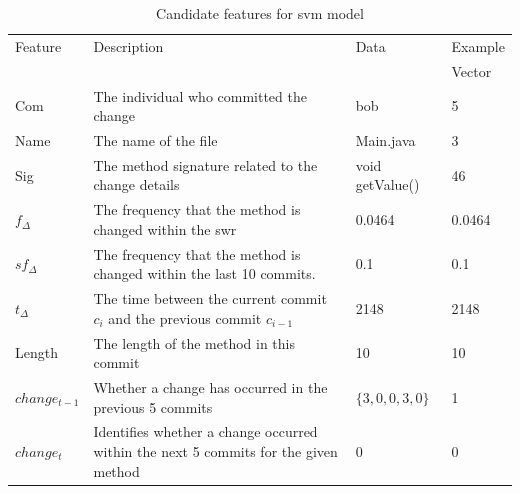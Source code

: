 \begin{table}
\begin{center}
    \begin{tabularx}{\linewidth}{|l|X|l|l|}
        \hline
        Feature & Description & Data & Example \\
         & & & Vector \\
        \hline
        Com & The individual who committed the change & bob & 5 \\ \hline
        Name & The name of the file & Main.java & 3 \\ \hline
        Sig & The method signature related to the change details & void getValue() & 46\\ \hline
        
        $f_{\Delta}$ & The frequency that the method is changed within the \gls{swr} & 0.0464 & 0.0464 \\ \hline
        $sf_{\Delta}$ & The frequency that the method is changed within the last 10 commits.  & 0.1 & 0.1 \\ \hline
        $t_\Delta$ & The time between the current commit $c_i$ and the previous commit $c_{i-1}$ & 2148 & 2148 \\ \hline

        Length & The length of the method in this commit & 10 & 10 \\ \hline
        $change_{t-1}$ & Whether a change has occurred in the previous 5 commits & $\{3, 0, 0, 3, 0\}$ & 1 \\
        \hline
        $change_{t}$ & Identifies whether a change occurred within the next 5 commits for the given method & 0 & 0\\
        \hline
    \end{tabularx}
\end{center}
    \caption{Candidate features for \gls{svm} model}
    \label{tab:candidate_features}
\end{table}


